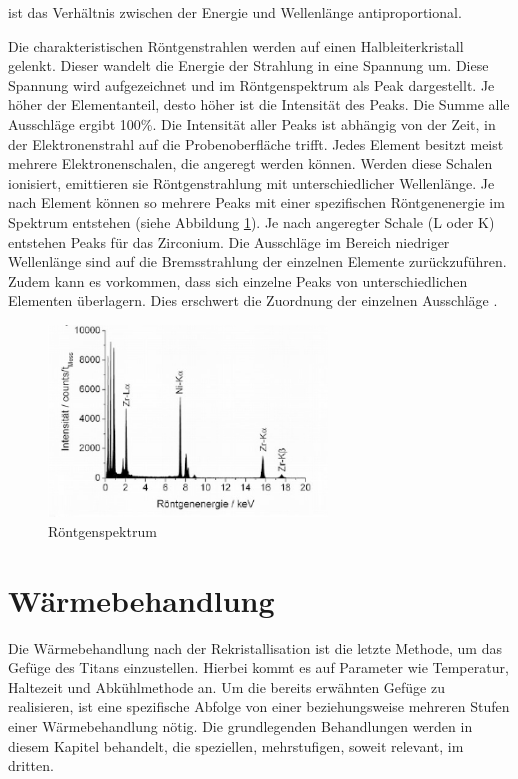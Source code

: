 \documentclass[a4paper, 11pt]{tubsreprt}
\begin{document}
ist das Verhältnis zwischen der Energie und Wellenlänge antiproportional.


Die charakteristischen Röntgenstrahlen werden auf einen Halbleiterkristall gelenkt. Dieser wandelt die Energie der Strahlung in eine Spannung um. Diese Spannung wird aufgezeichnet und im Röntgenspektrum als Peak dargestellt. Je höher der Elementanteil, desto höher ist die Intensität des Peaks. Die Summe alle Ausschläge ergibt 100\%. Die Intensität aller Peaks ist abhängig von der Zeit, in der Elektronenstrahl auf die Probenoberfläche trifft. 
Jedes Element besitzt meist mehrere Elektronenschalen, die angeregt werden können. Werden diese Schalen ionisiert, emittieren sie Röntgenstrahlung mit unterschiedlicher Wellenlänge. Je nach Element können so mehrere Peaks mit einer spezifischen Röntgenenergie im Spektrum entstehen (siehe Abbildung \ref{Röntgenspektrum}). Je nach angeregter Schale (L oder K) entstehen Peaks für das Zirconium. Die Ausschläge im Bereich niedriger Wellenlänge sind auf die Bremsstrahlung der einzelnen Elemente zurückzuführen. Zudem kann es vorkommen, dass sich einzelne Peaks von unterschiedlichen Elementen überlagern. Dies erschwert die Zuordnung der einzelnen Ausschläge \cite[vgl.]{Gemming2013}. 

\begin{figure}
\centering
\includegraphics[width=0.66\textwidth]{Bilder/Roentgenspektrum.png}
\caption[Röntgenspektrum]{Röntgenspektrum \cite{Gemming2013}}
\label{Röntgenspektrum}
\end{figure}
\section{Wärmebehandlung}

Die Wärmebehandlung nach der Rekristallisation ist die letzte Methode, um das Gefüge des Titans einzustellen. Hierbei kommt es auf Parameter wie Temperatur, Haltezeit und Abkühlmethode an. Um die bereits erwähnten Gefüge zu realisieren, ist eine spezifische Abfolge von einer beziehungsweise mehreren Stufen einer Wärmebehandlung nötig. Die grundlegenden Behandlungen werden in diesem Kapitel behandelt, die speziellen, mehrstufigen, soweit relevant, im dritten.
\end{document}
